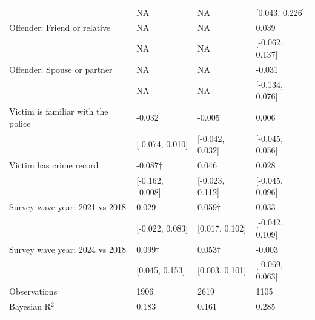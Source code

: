 \begin{tabular}[t]{llll}
 & NA & NA & {}[0.043, 0.226]\\
Offender: Friend or relative & NA & NA & 0.039\\
 & NA & NA & {}[-0.062, 0.137]\\
Offender: Spouse or partner & NA & NA & -0.031\\
 & NA & NA & {}[-0.134, 0.076]\\
Victim is familiar with the police & -0.032 & -0.005 & 0.006\\
 & {}[-0.074, 0.010] & {}[-0.042, 0.032] & {}[-0.045, 0.056]\\
Victim has crime record & -0.087$\dagger$ & 0.046 & 0.028\\
 & {}[-0.162, -0.008] & {}[-0.023, 0.112] & {}[-0.045, 0.096]\\
Survey wave year: 2021 vs 2018 & 0.029 & 0.059$\dagger$ & 0.033\\
 & {}[-0.022, 0.083] & {}[0.017, 0.102] & {}[-0.042, 0.109]\\
Survey wave year: 2024 vs 2018 & 0.099$\dagger$ & 0.053$\dagger$ & -0.003\\
 & {}[0.045, 0.153] & {}[0.003, 0.101] & {}[-0.069, 0.063]\\
\midrule
Observations & 1906 & 2619 & 1105\\
Bayesian R$^2$ & 0.183 & 0.161 & 0.285\\
\bottomrule
\end{tabular}